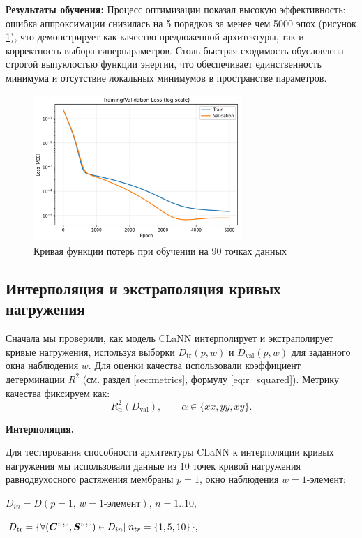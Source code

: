 \textbf{Результаты обучения:}
Процесс оптимизации показал высокую эффективность: ошибка аппроксимации снизилась на 5 порядков за менее чем 5000 эпох (рисунок \ref{fig:loss_curve}), 
что демонстрирует как качество предложенной архитектуры, так и корректность выбора гиперпараметров. 
Столь быстрая сходимость обусловлена строгой выпуклостью функции энергии, что обеспечивает единственность 
минимума и отсутствие локальных минимумов в пространстве параметров.

\begin{figure}[H]
  \centering
  \includegraphics[width=0.7\textwidth]{img/loss_curve.png}
  \caption{Кривая функции потерь при обучении на 90 точках данных}
  \label{fig:loss_curve}
\end{figure}


\subsection{Интерполяция и экстраполяция кривых нагружения}
  Сначала мы проверили, как модель CLaNN интерполирует и экстраполирует кривые нагружения, используя выборки
  $D_{\mathrm{tr}}(p,w)$ и $D_{\mathrm{val}}(p,w)$ для заданного окна наблюдения $w$.
  Для оценки качества использовали коэффициент детерминации $R^2$ (см. раздел \ref{sec:metrics}, формулу \eqref{eq:r_squared}). Метрику качества фиксируем как:
\[
  R^2_{\alpha}(D_{\mathrm{val}}),\qquad \alpha\in\{xx,yy,xy\}.
\]

  \textbf{Интерполяция.}  

  Для тестирования способности архитектуры CLaNN к интерполяции кривых нагружения мы использовали данные из 
  10 точек кривой нагружения равнодвухосного растяжения мембраны $p=1$, 
  окно наблюдения $w=\text{1-элемент}$:
  
  $D_{in} = D(p{=}1,\,w{=}\text{1-элемент}),\, n = 1..10,$
  
  $D_{\mathrm{tr}}=\{\forall (\boldsymbol{C}^{n_{tr}}, \boldsymbol{S}^{n_{tr}}) \in D_{in}|\; n_{tr}=\{1,5,10\}\},$
  
